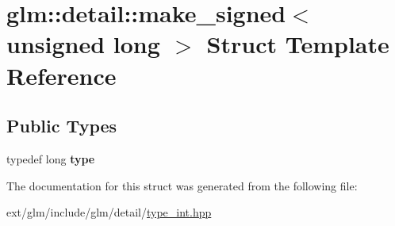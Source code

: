 \hypertarget{structglm_1_1detail_1_1make__signed_3_01unsigned_01long_01_4}{\section{glm\-:\-:detail\-:\-:make\-\_\-signed$<$ unsigned long $>$ Struct Template Reference}
\label{structglm_1_1detail_1_1make__signed_3_01unsigned_01long_01_4}
}
\subsection*{Public Types}
\begin{DoxyCompactItemize}
\item 
\hypertarget{structglm_1_1detail_1_1make__signed_3_01unsigned_01long_01_4_a055abdf7ba75d133a9784c2749f2336f}{typedef long {\bfseries type}}\label{structglm_1_1detail_1_1make__signed_3_01unsigned_01long_01_4_a055abdf7ba75d133a9784c2749f2336f}

\end{DoxyCompactItemize}


The documentation for this struct was generated from the following file\-:\begin{DoxyCompactItemize}
\item 
ext/glm/include/glm/detail/\hyperlink{type__int_8hpp}{type\-\_\-int.\-hpp}\end{DoxyCompactItemize}
